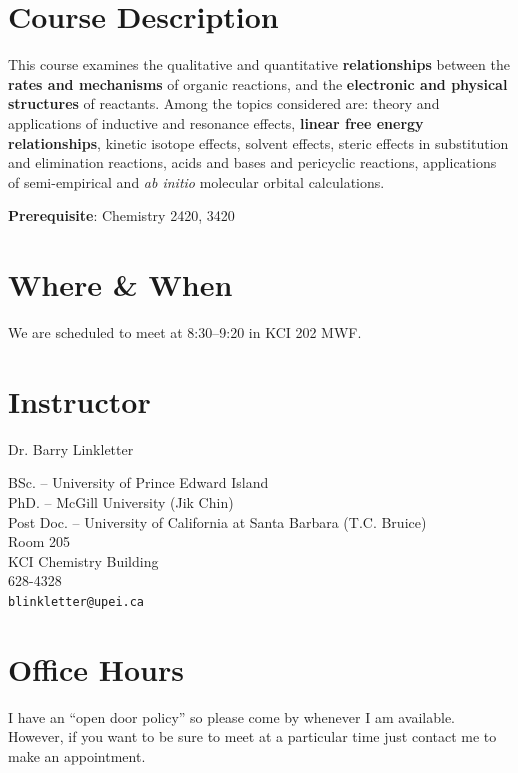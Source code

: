 \section{Course Description}

This course examines the qualitative and quantitative \textbf{relationships} between the \textbf{rates and mechanisms} of organic reactions, and the \textbf{electronic and physical structures} of reactants. Among the topics considered are: theory and applications of inductive and resonance effects, \textbf{linear free energy relationships}, kinetic isotope effects, solvent effects, steric effects in substitution and elimination reactions, acids and bases and pericyclic reactions, applications of semi-empirical and \textit{ab initio} molecular orbital calculations.

\smallskip\noindent\textbf{Prerequisite}: Chemistry 2420, 3420

\section{Where \& When}

We are scheduled to meet at 8:30--9:20 in KCI 202 MWF.

\section{Instructor}

Dr. Barry Linkletter

\begin{flushleft}
BSc. -- University of Prince Edward Island\\
PhD. -- McGill University (Jik Chin)\\
Post Doc. -- University of California at Santa Barbara (T.C. Bruice)\\[1em]

Room 205\\
KCI Chemistry Building\\
628-4328\\
\texttt{blinkletter@upei.ca}
\end{flushleft}

\section{Office Hours}

I have an ``open door policy'' so please come by whenever I am available. However, if you want to be sure to meet at a particular time just contact me to make an appointment.

